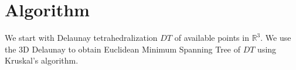 \documentclass[preprint,5p,times,twocolumn]{elsarticle}
\begin{document}
%    

\section{Algorithm}

We start with Delaunay tetrahedralization $DT$ of available points in $\mathbb{R}^3$. We use the 3D Delaunay to obtain Euclidean Minimum Spanning Tree of $DT$ using Kruskal's  algorithm.
\end{document}

